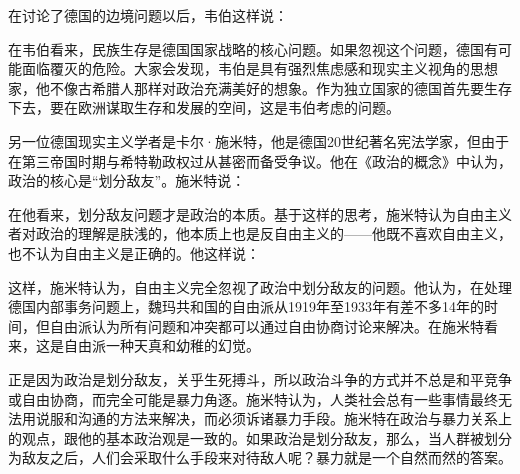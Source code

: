 在讨论了德国的边境问题以后，韦伯这样说：


在韦伯看来，民族生存是德国国家战略的核心问题。如果忽视这个问题，德国有可能面临覆灭的危险。大家会发现，韦伯是具有强烈焦虑感和现实主义视角的思想家，他不像古希腊人那样对政治充满美好的想象。作为独立国家的德国首先要生存下去，要在欧洲谋取生存和发展的空间，这是韦伯考虑的问题。

另一位德国现实主义学者是卡尔·施米特，他是德国20世纪著名宪法学家，但由于在第三帝国时期与希特勒政权过从甚密而备受争议。他在《政治的概念》中认为，政治的核心是“划分敌友”。施米特说：


在他看来，划分敌友问题才是政治的本质。基于这样的思考，施米特认为自由主义者对政治的理解是肤浅的，他本质上也是反自由主义的——他既不喜欢自由主义，也不认为自由主义是正确的。他这样说：


这样，施米特认为，自由主义完全忽视了政治中划分敌友的问题。他认为，在处理德国内部事务问题上，魏玛共和国的自由派从1919年至1933年有差不多14年的时间，但自由派认为所有问题和冲突都可以通过自由协商讨论来解决。在施米特看来，这是自由派一种天真和幼稚的幻觉。

正是因为政治是划分敌友，关乎生死搏斗，所以政治斗争的方式并不总是和平竞争或自由协商，而完全可能是暴力角逐。施米特认为，人类社会总有一些事情最终无法用说服和沟通的方法来解决，而必须诉诸暴力手段。施米特在政治与暴力关系上的观点，跟他的基本政治观是一致的。如果政治是划分敌友，那么，当人群被划分为敌友之后，人们会采取什么手段来对待敌人呢？暴力就是一个自然而然的答案。

